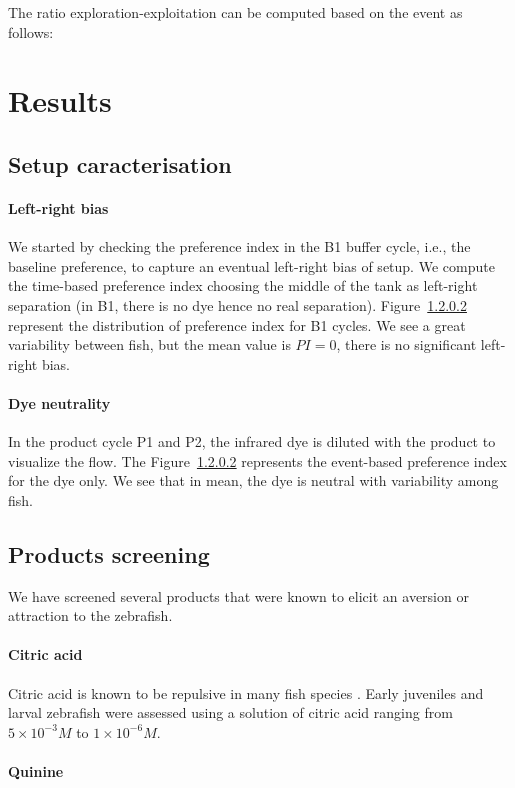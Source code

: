   The ratio exploration-exploitation can be computed based on the event as follows:
  $$$$

  \section{Results}
  \subsection{Setup caracterisation}
  \paragraph{Left-right bias} We started by checking the preference index in the B1 buffer cycle, i.e., the baseline preference, to capture an eventual left-right bias of setup. We compute the time-based preference index choosing the middle of the tank as left-right separation (in B1, there is no dye hence no real separation). Figure~\ref{} represent the distribution of preference index for B1 cycles. We see a great variability between fish, but the mean value is $PI=0$, there is no significant left-right bias.

  \paragraph{Dye neutrality} In the product cycle P1 and P2, the infrared dye is diluted with the product to visualize the flow. The Figure~\ref{} represents the event-based preference index for the dye only. We see that in mean, the dye is neutral with variability among fish.

  \subsection{Products screening}
  We have screened several products that were known to elicit an aversion or attraction to the zebrafish.

  \paragraph{Citric acid}
  Citric acid is known to be repulsive in many fish species \cite{}. Early juveniles and larval zebrafish were assessed using a solution of citric acid ranging from $5 \times 10^{-3} M$ to $1 \times 10^{-6} M$.

  \paragraph{Quinine}


